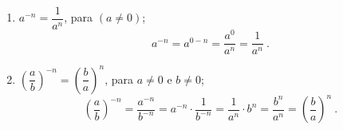\begin{enumerate}[P1)]





 \item $a^{-n}= \dfrac{1}{a^n}$, para $(a \neq 0)$;
\begin{equation*}
a^{-n}= a^{0-n}= \dfrac{a^0}{a^n}= \dfrac{1}{a^n} \ .
\end{equation*}

 \item $\left(\dfrac{a}{b} \right)^{-n}= \left(\dfrac{b}{a} \right)^{n}$, para $a \neq 0$ e $b \neq 0$;
\begin{equation*}
\left(\dfrac{a}{b} \right)^{-n}= \dfrac{a^{-n}}{b^{-n}}= a^{-n} \cdot \dfrac{1}{b^{-n}}= \dfrac{1}{a^n} \cdot b^{n}= \dfrac{b^n}{a^n}= \left(\dfrac{b}{a}\right)^n \ .
\end{equation*}

 \end{enumerate}


